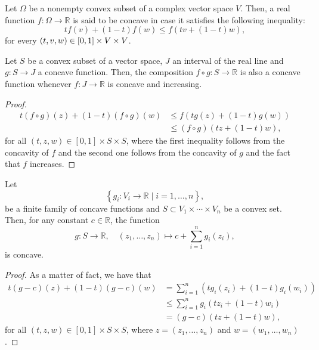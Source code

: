 \begin{definition}\label{def:concave-function}
  Let \(\Omega\) be a nonempty convex subset of a complex vector space \(V\).
  Then, a real function \(f:\Omega\to\mathbb{R}\) is said to be concave in case
  it satisfies the following inequality:
  \[
    tf(v)+(1-t)f(w)\leqslant{f(tv+(1-t)w)},
  \]
  for every \((t,v,w)\in{\interval{0}{1}\times{V}\times{V}}\).
\end{definition}

\begin{lemma}\label{lemma:concavity-of-compositions-of-concave-functions}
  Let \(S\) be a convex subset of a vector space, \(J\) an interval of the real
  line and \(g:S\to{J}\) a concave function. Then, the composition
  \(f\circ{g}:S\to\mathbb{R}\) is also a concave function whenever \(f:J\to\mathbb{R}\)
  is concave and increasing.
\end{lemma}

\begin{proof}
  \begin{align*}
    t(f\circ{g})(z)+(1-t)(f\circ{g})(w)
    &\leqslant{f(tg(z)+(1-t)g(w))}\\
    &\leqslant{(f\circ{g})(tz+(1-t)w)},
  \end{align*}
  for all \((t,z,w)\in{[0,1]\times{S}\times{S}}\), where the first inequality
  follows from the concavity of \(f\) and the second one follows from the
  concavity of \(g\) and the fact that \(f\) increases.
\end{proof}

\begin{lemma}\label{lemma:concavity-of-sums-of-concave-functions}
  Let
  \[
    \left\{g_{i}:V_{i}\to\mathbb{R}\mid{i=1,\ldots,n}\right\},
  \]
  be a finite family of concave functions and
  \(S\subset{V_{1}\times\cdots\times{V_{n}}}\) be a convex set. Then, for any
  constant \(c\in\mathbb{R}\), the function
  \[
    g:S\to\mathbb{R},\quad{(z_{1},\ldots,z_{n})\mapsto{c+\sum_{i=1}^{n}g_{i}(z_{i})}},
  \]
  is concave.
\end{lemma}

\begin{proof}
  As a matter of fact, we have that
  \begin{align*}
    t(g-c)(z)+(1-t)(g-c)(w)
    &=
    \sum_{i=1}^{n}\left(tg_{i}(z_{i})+(1-t)g_{i}(w_{i})\right)
    \\
    &\leqslant
    \sum_{i=1}^{n}g_{i}\left(tz_{i}+(1-t)w_{i}\right)
    \\
    &=
    (g-c)\left(tz+(1-t)w\right),
  \end{align*}
  for all \((t,z,w)\in{[0,1]\times{S}\times{S}}\), where
  \(z=(z_{1},\ldots,z_{n})\) and \(w=(w_{1},\ldots,w_{n})\).
\end{proof}

